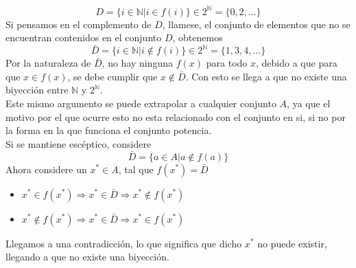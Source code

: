 \documentclass[../main.tex]{subfiles}
\begin{document}
\[ D = \{ i \in \mathds{N} | i \in f(i) \} \in 2^{\mathds{N}} = \{ 0, 2, \ldots \} \]
Si pensamos en el complemento de $D$, llamese, el conjunto de elementos que no se encuentran contenidos en el conjunto $D$, obtenemos
\[ \bar{D} = \{ i \in \mathds{N} | i \not\in f(i) \} \in 2^{\mathds{N}} = \{ 1, 3, 4, \ldots \} \]
Por la naturaleza de $\bar{D}$, no hay ninguna $f(x)$ para todo $x$, debido a que para que $x \in f(x)$, se debe cumplir que $x \not\in \bar{D}$. Con esto se llega a que no existe una biyección entre $\mathds{N}$ y $2^{\mathds{N}}$.\\
Este mismo argumento se puede extrapolar a cualquier conjunto $A$, ya que el motivo por el que ocurre esto no esta relacionado con el conjunto en si, si no por la forma en la que funciona el conjunto potencia.\\
Si se mantiene escéptico, considere
\[ \bar{D} = \{ a \in A | a \not\in f(a) \} \]
Ahora considere un $x^* \in A$, tal que $f(x^*) = \bar{D}$
\begin{itemize}
    \item $x^* \in f(x^*) \Rightarrow x^* \in \bar{D} \Rightarrow x^* \not\in f(x^*)$
    \item $x^* \not\in f(x^*) \Rightarrow x^* \in \bar{D} \Rightarrow x^* \in f(x^*)$
\end{itemize}
Llegamos a una contradicción, lo que significa que dicho $x^*$ no puede existir, llegando a que no existe una biyección.
\end{document}
